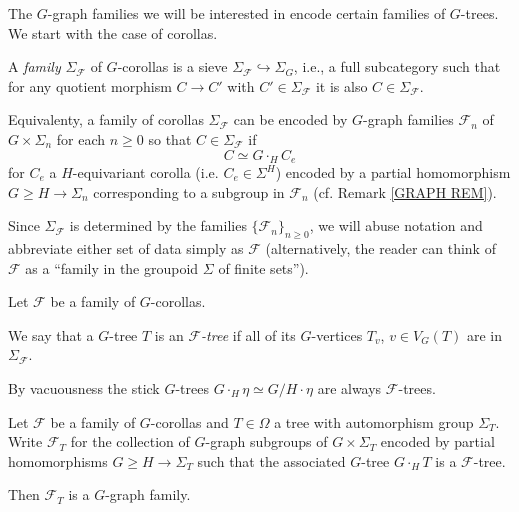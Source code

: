 \documentclass[a4paper,10pt]{article}%
\begin{document}
The $G$-graph families we will be interested in encode certain families of $G$-trees. We start with the case of corollas.


\begin{definition}
	A \textit{family} $\Sigma_{\mathcal{F}}$ of $G$-corollas is a sieve 
	$\Sigma_{\mathcal{F}} \hookrightarrow \Sigma_G$, i.e., a full subcategory such that for any quotient morphism $C \to C'$ with $C' \in \Sigma_{\mathcal{F}}$ it is also $C \in \Sigma_{\mathcal{F}}$.
\end{definition}

\begin{remark}
	Equivalenty, a family of corollas $\Sigma_{\mathcal{F}}$
	can be encoded by
	$G$-graph families $\mathcal{F}_n$ of $G \times \Sigma_n$ for each $n \geq 0$ so that $C \in \Sigma_{\mathcal{F}}$ if 
	\[C \simeq G \cdot_H C_e\]
for $C_e$ a $H$-equivariant corolla 
(i.e. $C_e \in \Sigma^H$)
encoded by a partial homomorphism $G \geq H \to \Sigma_n$ corresponding to a subgroup in $\mathcal{F}_n$ 
	(cf. Remark \ref{GRAPH REM}). 
\end{remark}

Since $\Sigma_{\mathcal{F}}$ is determined by the families $\{\mathcal{F}_n\}_{n \geq 0}$, we will abuse notation and abbreviate either set of data simply as $\mathcal{F}$ (alternatively, the reader can think of $\mathcal{F}$ as a ``family in the groupoid $\Sigma$ of finite sets''). 


\begin{definition}
Let $\mathcal{F}$ be a family of $G$-corollas.

We say that a $G$-tree $T$ is an \textit{$\mathcal{F}$-tree}
if all of its $G$-vertices $T_{v}$, $v \in V_G(T)$ are in 
$\Sigma_{\mathcal{F}}$.
\end{definition}


\begin{remark}\label{VACUOUSNESS REM}
	By vacuousness the stick $G$-trees
	$G \cdot_H \eta \simeq G/H \cdot \eta$ are always $\mathcal{F}$-trees.
\end{remark}


\begin{proposition}
Let $\mathcal{F}$ be a family of $G$-corollas and $T \in \Omega$ a tree with automorphism group $\Sigma_T$.
	Write $\mathcal{F}_T$ for the collection of $G$-graph subgroups of 
	$G \times \Sigma_T$ encoded by partial homomorphisms
	$G \geq H \to \Sigma_T$ such that the associated $G$-tree
	$G \cdot_H T$ is a $\mathcal{F}$-tree.
	
	Then $\mathcal{F}_T$ is a $G$-graph family.
\end{proposition}
\end{document}
